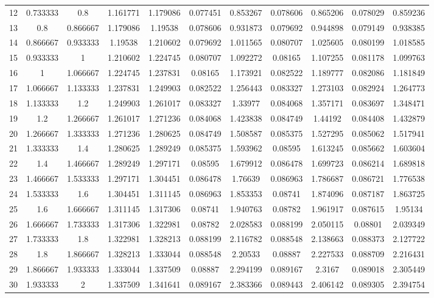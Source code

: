 \documentclass[11pt]{article}
\begin{document}
\begin{table}[H]
{\begin{tabular}{c c c c c c c c c c c}
                12 & 0.733333 & 0.8 & 1.161771 & 1.179086 & 0.077451 & 0.853267 & 0.078606 & 0.865206 & 0.078029 & 0.859236 \\
                13 & 0.8 & 0.866667 & 1.179086 & 1.19538 & 0.078606 & 0.931873 & 0.079692 & 0.944898 & 0.079149 & 0.938385 \\
                14 & 0.866667 & 0.933333 & 1.19538 & 1.210602 & 0.079692 & 1.011565 & 0.080707 & 1.025605 & 0.080199 & 1.018585 \\
                15 & 0.933333 & 1 & 1.210602 & 1.224745 & 0.080707 & 1.092272 & 0.08165 & 1.107255 & 0.081178 & 1.099763 \\
                16 & 1 & 1.066667 & 1.224745 & 1.237831 & 0.08165 & 1.173921 & 0.082522 & 1.189777 & 0.082086 & 1.181849 \\
                17 & 1.066667 & 1.133333 & 1.237831 & 1.249903 & 0.082522 & 1.256443 & 0.083327 & 1.273103 & 0.082924 & 1.264773 \\
                18 & 1.133333 & 1.2 & 1.249903 & 1.261017 & 0.083327 & 1.33977 & 0.084068 & 1.357171 & 0.083697 & 1.348471 \\
                19 & 1.2 & 1.266667 & 1.261017 & 1.271236 & 0.084068 & 1.423838 & 0.084749 & 1.44192 & 0.084408 & 1.432879 \\
                20 & 1.266667 & 1.333333 & 1.271236 & 1.280625 & 0.084749 & 1.508587 & 0.085375 & 1.527295 & 0.085062 & 1.517941 \\
                21 & 1.333333 & 1.4 & 1.280625 & 1.289249 & 0.085375 & 1.593962 & 0.08595 & 1.613245 & 0.085662 & 1.603604 \\
                22 & 1.4 & 1.466667 & 1.289249 & 1.297171 & 0.08595 & 1.679912 & 0.086478 & 1.699723 & 0.086214 & 1.689818 \\
                23 & 1.466667 & 1.533333 & 1.297171 & 1.304451 & 0.086478 & 1.76639 & 0.086963 & 1.786687 & 0.086721 & 1.776538 \\
                24 & 1.533333 & 1.6 & 1.304451 & 1.311145 & 0.086963 & 1.853353 & 0.08741 & 1.874096 & 0.087187 & 1.863725 \\
                25 & 1.6 & 1.666667 & 1.311145 & 1.317306 & 0.08741 & 1.940763 & 0.08782 & 1.961917 & 0.087615 & 1.95134 \\
                26 & 1.666667 & 1.733333 & 1.317306 & 1.322981 & 0.08782 & 2.028583 & 0.088199 & 2.050115 & 0.08801 & 2.039349 \\
                27 & 1.733333 & 1.8 & 1.322981 & 1.328213 & 0.088199 & 2.116782 & 0.088548 & 2.138663 & 0.088373 & 2.127722 \\
                28 & 1.8 & 1.866667 & 1.328213 & 1.333044 & 0.088548 & 2.20533 & 0.08887 & 2.227533 & 0.088709 & 2.216431 \\
                29 & 1.866667 & 1.933333 & 1.333044 & 1.337509 & 0.08887 & 2.294199 & 0.089167 & 2.3167 & 0.089018 & 2.305449 \\
                30 & 1.933333 & 2 & 1.337509 & 1.341641 & 0.089167 & 2.383366 & 0.089443 & 2.406142 & 0.089305 & 2.394754 \\
                \bottomrule
            \end{tabular}
        }
    \end{table}
\end{document}
